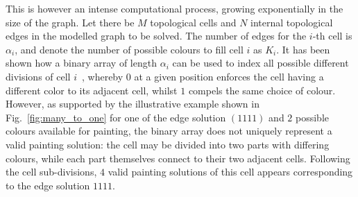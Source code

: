 \documentclass[conference]{IEEEtran}
\begin{document}
This is however an intense computational process, growing exponentially in the size of the graph. Let there be $M$ topological cells and $N$ internal topological edges in the modelled graph to be solved. The number of edges for the $i$-th cell is $\alpha_i$, and denote the number of possible colours to fill cell $i$ as $K_i$.   
It has been shown how a binary array of length $\alpha_i$ can be used to index all possible different divisions of cell $i$~\cite{Yang2020Cellular}, whereby 
$0$ at a given position enforces the cell having a different color to its adjacent cell, whilst $1$ compels the same choice of colour. 
However, as supported by the illustrative example shown in Fig.~\ref{fig:many_to_one} for one of the edge solution $(1111)$ and $2$ possible colours available for painting, the binary array does not uniquely represent a valid painting solution: the cell may be divided into two parts with differing colours, while each part themselves connect to their two adjacent cells. Following the cell sub-divisions, $4$ valid painting solutions of this cell appears corresponding to the edge solution $1111$. 
\end{document}
